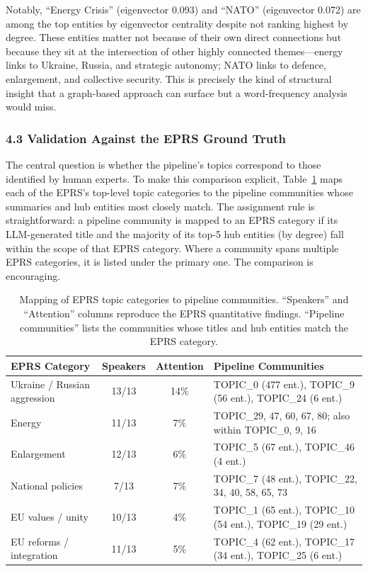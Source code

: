 \documentclass[11pt]{article}
\begin{document}
Notably, ``Energy Crisis'' (eigenvector 0.093) and ``NATO'' (eigenvector 0.072) are among the top entities by eigenvector centrality despite not ranking highest by degree. These entities matter not because of their own direct connections but because they sit at the intersection of other highly connected themes---energy links to Ukraine, Russia, and strategic autonomy; NATO links to defence, enlargement, and collective security. This is precisely the kind of structural insight that a graph-based approach can surface but a word-frequency analysis would miss.


\subsubsection{4.3 Validation Against the EPRS Ground Truth}


The central question is whether the pipeline's topics correspond to those identified by human experts. To make this comparison explicit, Table~\ref{tab:eprs} maps each of the EPRS's top-level topic categories to the pipeline communities whose summaries and hub entities most closely match. The assignment rule is straightforward: a pipeline community is mapped to an EPRS category if its LLM-generated title and the majority of its top-5 hub entities (by degree) fall within the scope of that EPRS category. Where a community spans multiple EPRS categories, it is listed under the primary one. The comparison is encouraging.

\begin{table}[h]
\centering
\small
\caption{Mapping of EPRS topic categories to pipeline communities. ``Speakers'' and ``Attention'' columns reproduce the EPRS quantitative findings. ``Pipeline communities'' lists the communities whose titles and hub entities match the EPRS category.}
\label{tab:eprs}
\begin{tabular}{p{2.8cm}ccp{5.5cm}}
\toprule
\textbf{EPRS Category} & \textbf{Speakers} & \textbf{Attention} & \textbf{Pipeline Communities} \\
\midrule
Ukraine / Russian aggression & 13/13 & 14\% & TOPIC\_0 (477 ent.), TOPIC\_9 (56 ent.), TOPIC\_24 (6 ent.) \\
Energy & 11/13 & 7\% & TOPIC\_29, 47, 60, 67, 80; also within TOPIC\_0, 9, 16 \\
Enlargement & 12/13 & 6\% & TOPIC\_5 (67 ent.), TOPIC\_46 (4 ent.) \\
National policies & 7/13 & 7\% & TOPIC\_7 (48 ent.), TOPIC\_22, 34, 40, 58, 65, 73 \\
EU values / unity & 10/13 & 4\% & TOPIC\_1 (65 ent.), TOPIC\_10 (54 ent.), TOPIC\_19 (29 ent.) \\
EU reforms / integration & 11/13 & 5\% & TOPIC\_4 (62 ent.), TOPIC\_17 (34 ent.), TOPIC\_25 (6 ent.) \\
\bottomrule
\end{tabular}
\end{table}
\end{document}
